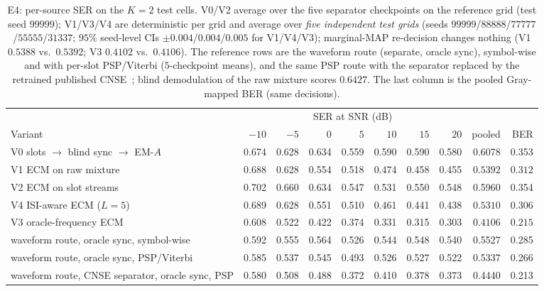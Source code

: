 \documentclass[journal]{IEEEtran}
\begin{document}
\begin{table}[!t]
\centering
\caption{E4: per-source SER on the $K{=}2$ test cells. V0/V2 average
over the five separator checkpoints on the reference grid (test seed
$99999$); V1/V3/V4 are deterministic per grid and average over
\emph{five independent test grids} (seeds
$99999$/$88888$/$77777$/$55555$/$31337$; $95\%$ seed-level CIs
$\pm 0.004$/$0.004$/$0.005$ for V1/V4/V3); marginal-MAP re-decision
changes nothing (V1 $0.5388$ vs.\ $0.5392$; V3 $0.4102$ vs.\ $0.4106$).
The reference rows are the waveform route (separate, oracle sync),
symbol-wise and with per-slot PSP/Viterbi ($5$-checkpoint means), and
the same PSP route with the separator replaced by the retrained
published CNSE~\cite{hou2022single};
blind demodulation of the raw mixture scores $0.6427$. The last column
is the pooled Gray-mapped BER (same decisions).}
\label{tab:e4}
\setlength{\tabcolsep}{3pt}
\scriptsize
\begin{tabular}{lrrrrrrrrr}
\toprule
& \multicolumn{7}{c}{SER at SNR (dB)} & & \\
\cmidrule(lr){2-8}
Variant & $-10$ & $-5$ & $0$ & $5$ & $10$ & $15$ & $20$ & pooled &
BER \\
\midrule
V0 slots $\to$ blind sync $\to$ EM-$A$ &
  0.674 & 0.628 & 0.634 & 0.559 & 0.590 & 0.590 & 0.580 & 0.6078 &
  0.353 \\
V1 ECM on raw mixture &
  0.688 & 0.628 & 0.554 & 0.518 & 0.474 & 0.458 & 0.455 & $0.5392$ &
  $0.312$ \\
V2 ECM on slot streams &
  0.702 & 0.660 & 0.634 & 0.547 & 0.531 & 0.550 & 0.548 & 0.5960 &
  0.354 \\
V4 ISI-aware ECM ($L{=}5$) &
  0.689 & 0.628 & 0.551 & 0.510 & 0.461 & 0.441 & 0.438 & $0.5310$ &
  $0.306$ \\
V3 oracle-frequency ECM &
  0.608 & 0.522 & 0.422 & 0.374 & 0.331 & 0.315 & 0.303 & $0.4106$ &
  $0.215$ \\
\midrule
waveform route, oracle sync, symbol-wise &
  0.592 & 0.555 & 0.564 & 0.526 & 0.544 & 0.548 & 0.540 & 0.5527 &
  0.285 \\
waveform route, oracle sync, PSP/Viterbi &
  0.585 & 0.537 & 0.545 & 0.493 & 0.526 & 0.527 & 0.522 & 0.5337 &
  0.266 \\
waveform route, CNSE separator, oracle sync, PSP &
  0.580 & 0.508 & 0.488 & 0.372 & 0.410 & 0.378 & 0.373 & 0.4440 &
  0.213 \\
\bottomrule
\end{tabular}
\end{table}
\end{document}
